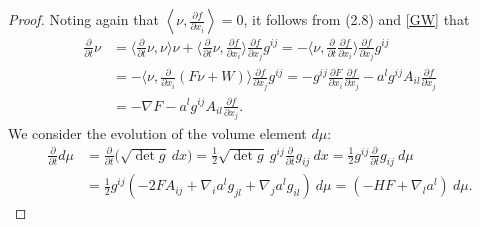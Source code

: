 \documentclass[10pt,a4paper]{amsart}
\begin{document}
\begin{proof}
Noting again that $\left <\nu, \frac{\partial f}{\partial x_i}\right >=0$, it  follows  from (2.8) and \eqref{GW}   that
\begin{align}
\frac{\partial}{\partial t} \nu &= \langle \frac{\partial}{\partial
t}\nu, \nu \rangle \nu
+\langle \frac{\partial}{\partial
t}\nu, \frac{\partial f}{\partial x_i}\rangle \frac{\partial
f}{\partial x_j}g^{ij}=-\langle \nu, \frac{\partial}{\partial
t}\frac{\partial f}{\partial x_i}\rangle \frac{\partial f}{\partial
x_j}g^{ij}\nonumber\\
&=-\langle \nu, \frac{\partial}{\partial x_i}(F\nu+W)\rangle
\frac{\partial f}{\partial x_j}g^{ij}
=-g^{ij}\frac{\partial F}{\partial x_i} \frac{\partial
f}{\partial x_j}- a^l g^{ij}A_{il}\frac{\partial f}{\partial x_j}\nonumber\\
&=-\nabla F-a^l g^{ij}A_{il}\frac{\partial f}{\partial x_j}.\nonumber
\end{align}
We consider the evolution of the volume element $d\mu$:
\begin{align}\label{dm}
\frac{\partial}{\partial t} d\mu&=\frac{\partial}{\partial t}
\big(\sqrt{\det g}~ dx\big)=\frac{1}{2}{\sqrt{\det g}}~
g^{ij}\frac{\partial}{\partial t}g_{ij}
~dx=\frac{1}{2}g^{ij}\frac{\partial}{\partial t}g_{ij}
~d\mu  \\
&=\frac{1}{2}g^{ij}(-2F A_{ij}+\nabla_i a^l g_{jl}+\nabla_j
a^lg_{il}) ~d\mu=(-HF+\nabla_l a^l)~d\mu.\nonumber
\end{align}



\end{proof}
\end{document}
